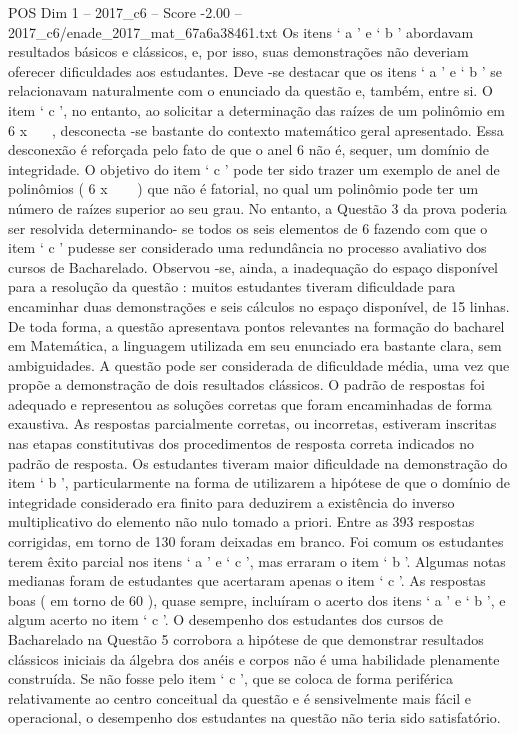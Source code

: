 \begin{textsample}{POS Dim 1 – 2017\_c6 – Score -2.00 – 2017\_c6/enade\_2017\_mat\_67a6a38461.txt}
Os itens ‘ a ’ e ‘ b ’ abordavam resultados básicos e clássicos, e, por isso, suas demonstrações não deveriam oferecer dificuldades aos estudantes.
Deve -se destacar que os itens ‘ a ’ e ‘ b ’ se relacionavam naturalmente com o enunciado da questão e, também, entre si.
O item ‘ c ’, no entanto, ao solicitar a determinação das raízes de um polinômio em 6 x  , desconecta -se bastante do contexto matemático geral apresentado.
Essa desconexão é reforçada pelo fato de que o anel 6 não é, sequer, um domínio de integridade.
O objetivo do item ‘ c ’ pode ter sido trazer um exemplo de anel de polinômios ( 6 x   ) que não é fatorial, no qual um polinômio pode ter um número de raízes superior ao seu grau.
No entanto, a Questão 3 da prova poderia ser resolvida determinando- se todos os seis elementos de 6 fazendo com que o item ‘ c ’ pudesse ser considerado uma redundância no processo avaliativo dos cursos de Bacharelado.
Observou -se, ainda, a inadequação do espaço disponível para a resolução da questão : muitos estudantes tiveram dificuldade para encaminhar duas demonstrações e seis cálculos no espaço disponível, de 15 linhas.
De toda forma, a questão apresentava pontos relevantes na formação do bacharel em Matemática, a linguagem utilizada em seu enunciado era bastante clara, sem ambiguidades.
A questão pode ser considerada de dificuldade média, uma vez que propõe a demonstração de dois resultados clássicos.
O padrão de respostas foi adequado e representou as soluções corretas que foram encaminhadas de forma exaustiva.
As respostas parcialmente corretas, ou incorretas, estiveram inscritas nas etapas constitutivas dos procedimentos de resposta correta indicados no padrão de resposta.
Os estudantes tiveram maior dificuldade na demonstração do item ‘ b ’, particularmente na forma de utilizarem a hipótese de que o domínio de integridade considerado era finito para deduzirem a existência do inverso multiplicativo do elemento não nulo tomado a priori.
Entre as 393 respostas corrigidas, em torno de 130 foram deixadas em branco.
Foi comum os estudantes terem êxito parcial nos itens ‘ a ’ e ‘ c ’, mas erraram o item ‘ b ’.
Algumas notas medianas foram de estudantes que acertaram apenas o item ‘ c ’.
As respostas boas ( em torno de 60 ), quase sempre, incluíram o acerto dos itens ‘ a ’ e ‘ b ’, e algum acerto no item ‘ c ’.
O desempenho dos estudantes dos cursos de Bacharelado na Questão 5 corrobora a hipótese de que demonstrar resultados clássicos iniciais da álgebra dos anéis e corpos não é uma habilidade plenamente construída.
Se não fosse pelo item ‘ c ’, que se coloca de forma periférica relativamente ao centro conceitual da questão e é sensivelmente mais fácil e operacional, o desempenho dos estudantes na questão não teria sido satisfatório.

\end{textsample}
